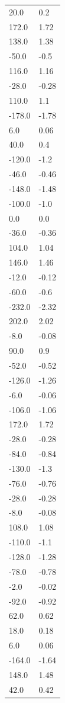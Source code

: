 \begin{longtable}{ll}
20.0 & 0.2 \\
172.0 & 1.72 \\
138.0 & 1.38 \\
-50.0 & -0.5 \\
116.0 & 1.16 \\
-28.0 & -0.28 \\
110.0 & 1.1 \\
-178.0 & -1.78 \\
6.0 & 0.06 \\
40.0 & 0.4 \\
-120.0 & -1.2 \\
-46.0 & -0.46 \\
-148.0 & -1.48 \\
-100.0 & -1.0 \\
0.0 & 0.0 \\
-36.0 & -0.36 \\
104.0 & 1.04 \\
146.0 & 1.46 \\
-12.0 & -0.12 \\
-60.0 & -0.6 \\
-232.0 & -2.32 \\
202.0 & 2.02 \\
-8.0 & -0.08 \\
90.0 & 0.9 \\
-52.0 & -0.52 \\
-126.0 & -1.26 \\
-6.0 & -0.06 \\
-106.0 & -1.06 \\
172.0 & 1.72 \\
-28.0 & -0.28 \\
-84.0 & -0.84 \\
-130.0 & -1.3 \\
-76.0 & -0.76 \\
-28.0 & -0.28 \\
-8.0 & -0.08 \\
108.0 & 1.08 \\
-110.0 & -1.1 \\
-128.0 & -1.28 \\
-78.0 & -0.78 \\
-2.0 & -0.02 \\
-92.0 & -0.92 \\
62.0 & 0.62 \\
18.0 & 0.18 \\
6.0 & 0.06 \\
-164.0 & -1.64 \\
148.0 & 1.48 \\
42.0 & 0.42 \\

\end{longtable}

